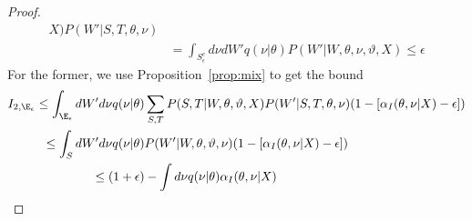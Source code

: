 \begin{proof}
\begin{align*}
X)P(W' | S, T, \theta, \nu) \\ 
& = \int_{S^c_{\epsilon}} d\nu dW'
q(\nu | \theta) P(W' |  W, \theta, \nu, \vartheta, X) 
\le \epsilon 
\end{align*}
{For the former, we use Proposition~\ref{prop:mix} to get the bound}
\begin{align*}
I_{2,\E_{\epsilon}} \le \int_{\E_\epsilon}dW' d\nu q(\nu | \theta) &
  \sum_{S,T} P(S, T | W, \theta, \vartheta, X)P(W' | S, T, \theta, \nu) 
  ( 1 - [\alpha_I(\theta, \nu | X)-\epsilon]) \\
\le \int_{S}dW' d\nu q(\nu | \theta) &
  P(W' | W, \theta, \vartheta, \nu) 
  ( 1 - [\alpha_I(\theta, \nu | X)-\epsilon]) \\
  \le (1+\epsilon) & - \int d\nu q(\nu | \theta) \alpha_I(\theta, \nu | X) 
\end{align*}


\end{proof}
